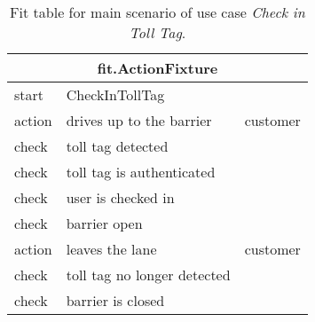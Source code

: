 \begin{table}[H]
\begin{center}
\begin{tabular}{|l|l|l|}
\hline \multicolumn{3}{|c|}{fit.ActionFixture} \tabularnewline
\hline start & \multicolumn{1}{l}{CheckInTollTag} & \tabularnewline
\hline action & drives up to the barrier & customer \tabularnewline
\hline check & \multicolumn{1}{l}{toll tag detected} & \tabularnewline
\hline check & \multicolumn{1}{l}{toll tag is authenticated} & \tabularnewline
\hline check & \multicolumn{1}{l}{user is checked in} & \tabularnewline
\hline check & \multicolumn{1}{l}{barrier open} & \tabularnewline
\hline action & leaves the lane & customer \tabularnewline
\hline check & \multicolumn{1}{l}{toll tag no longer detected} & \tabularnewline
\hline check & \multicolumn{1}{l}{barrier is closed} & \tabularnewline
\hline 
\end{tabular}
\end{center}
\caption{Fit table for main scenario of use case \emph{Check in Toll Tag}.}
\end{table}

